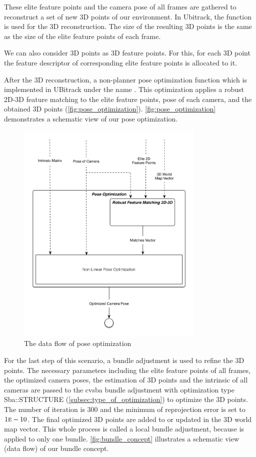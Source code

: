 These elite feature points and the camera pose of all frames are gathered to reconstruct a set of new 3D points of our environment. In Ubitrack, the  function is used for the 3D reconstruction. The size of the resulting 3D points is the same as the size of the elite feature points of each frame. 

We can also consider 3D points as 3D feature points. For this, for each 3D point the feature descriptor of corresponding elite feature points is allocated to it.  

After the 3D reconstruction, a non-planner pose optimization function \cite{lu2000fast} which is implemented in UBitrack under the name . This optimization applies a robust 2D-3D feature matching to the elite feature points, pose of each camera, and the obtained 3D points (\autoref{fig:pose_optimization}). \autoref{fig:pose_optimization} demonstrates a schematic view of our pose optimization.

\begin{figure}[H]
  \centering
  \includegraphics[width=90mm]{figures/pose_optimization}
  \caption{The data flow of pose optimization}\label{fig:pose_optimization}
\end{figure}

For the last step of this scenario, a bundle adjustment is used to refine the 3D points. The necessary parameters including the elite feature points of all frames, the optimized camera poses, the estimation of 3D points and the intrinsic of all cameras are passed to the cvsba bundle adjustment with optimization type Sba::STRUCTURE (\autoref{subsec:type_of_optimization}) to optimize the 3D points. The number of iteration is 300 and the minimum of reprojection error is set to $1\mbox{\textsc{e}}-10$. The final optimized 3D points are added to or updated in the 3D world map vector. This whole process is called a local bundle adjustment, because is applied to only one bundle. \autoref{fig:bundle_concept} illustrates a schematic view (data flow) of our bundle concept.

